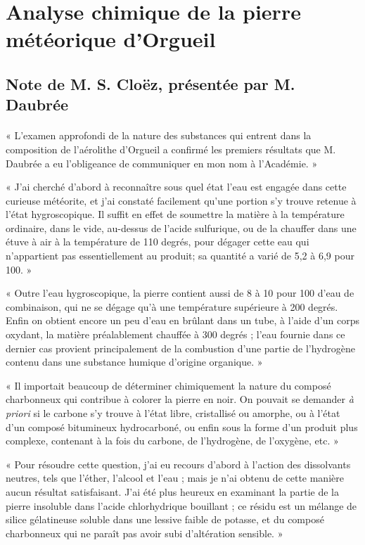\documentclass[a4paper, 11pt, oneside, polutonikogreek, french]{article}
\begin{document}
\section{Analyse chimique de la pierre météorique d'Orgueil}
\subsection*{Note de M. S. Cloëz, présentée par M. Daubrée}
\paragraph{}
« L'examen approfondi de la nature des substances qui entrent dans la composition de l'aérolithe d'Orgueil a confirmé les premiers résultats que M. Daubrée a eu l'obligeance de communiquer en mon nom à l'Académie. »

« J'ai cherché d'abord à reconnaître sous quel état l'eau est engagée dans cette curieuse météorite, et j'ai constaté facilement qu'une portion s'y trouve retenue à l'état hygroscopique. Il suffit en effet de soumettre la matière à la température ordinaire, dans le vide, au-dessus de l'acide sulfurique, ou de la chauffer dans une étuve à air à la température de 110 degrés, pour dégager cette eau qui n'appartient pas essentiellement au produit; sa quantité a varié de 5,2 à 6,9 pour 100. »

« Outre l'eau hygroscopique, la pierre contient aussi de 8 à 10 pour 100 d'eau de combinaison, qui ne se dégage qu'à une température supérieure à 200 degrés. Enfin on obtient encore un peu d'eau en brûlant dans un tube, à l'aide d'un corps oxydant, la matière préalablement chauffée à 300 degrés ; l'eau fournie dans ce dernier cas provient principalement de la combustion d'une partie de l'hydrogène contenu dans une substance humique d'origine organique. »

« Il importait beaucoup de déterminer chimiquement la nature du composé charbonneux qui contribue à colorer la pierre en noir. On pouvait se demander \emph{à priori} si le carbone s'y trouve à l'état libre, cristallisé ou amorphe, ou à l'état d'un composé bitumineux hydrocarboné, ou enfin sous la forme d'un produit plus complexe, contenant à la fois du carbone, de l'hydrogène, de l'oxygène, etc. »

« Pour résoudre cette question, j'ai eu recours d'abord à l'action des dissolvants neutres, tels que l'éther, l'alcool et l'eau ; mais je n'ai obtenu de cette manière aucun résultat satisfaisant. J'ai été plus heureux en examinant la partie de la pierre insoluble dans l'acide chlorhydrique bouillant ; ce résidu est un mélange de silice gélatineuse soluble dans une lessive faible de potasse, et du composé charbonneux qui ne paraît pas avoir subi d'altération sensible. »
\end{document}
